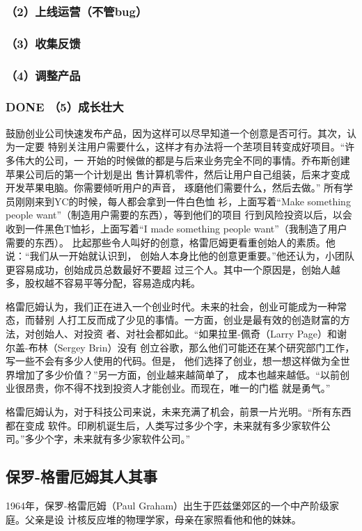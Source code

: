 \documentclass[11pt]{ctexart}
\begin{document}
{{{{\subsubsection{（2）上线运营（不管bug）}
\label{sec:orgb1d20eb}
\subsubsection{（3）收集反馈}
\label{sec:org1592720}
\subsubsection{（4）调整产品}
\label{sec:orgc1f4898}
\subsubsection{{\bfseries\sffamily DONE} （5）成长壮大}
\label{sec:orged9da84}
鼓励创业公司快速发布产品，因为这样可以尽早知道一个创意是否可行。其次，认为一定要
特别关注用户需要什么，这样才有办法将一个苤项目转变成好项目。“许多伟大的公司，一
开始的时候做的都是与后来业务完全不同的事情。乔布斯创建苹果公司后的第一个计划是出
售计算机零件，然后让用户自己组装，后来才变成开发苹果电脑。你需要倾听用户的声音，
琢磨他们需要什么，然后去做。” 所有学员刚刚来到YC的时候，每人都会拿到一件白色恤
衫，上面写着“Make something people want”（制造用户需要的东西），等到他们的项目
行到风险投资以后，以会收到一件黑色T恤衫，上面写着“I made something people
want”（我制造了用户需要的东西）。
比起那些令人叫好的创意，格雷厄姆更看重创始人的素质。他说：“我们从一开始就认识到，
创始人本身比他的创意更重要。”他还认为，小团队更容易成功，创始成员总数最好不要超
过三个人。其中一个原因是，创始人越多，股权越不容易平等分配，容易造成内耗。

格雷厄姆认为，我们正在进入一个创业时代。未来的社会，创业可能成为一种常态，而替别
人打工反而成了少见的事情。一方面，创业是最有效的创造财富的方法，对创始人、对投资
者、对社会都如此。“如果拉里-佩奇（Larry Page）和谢尔盖-布林（Sergey Brin）没有
创立谷歌，那么他们可能还在某个研究部门工作，写一些不会有多少人使用的代码。但是，
他们选择了创业，想一想这样做为全世界增加了多少价值？”另一方面，创业越来越简单了，
成本也越来越低。“以前创业很昂贵，你不得不找到投资人才能创业。而现在，唯一的门槛
就是勇气。”

格雷厄姆认为，对于科技公司来说，未来充满了机会，前景一片光明。“所有东西都在变成
软件。印刷机诞生后，人类写过多少个字，未来就有多少家软件公司。”多少个字，未来就有多少家软件公司。”

\subsection{保罗-格雷厄姆其人其事}
\label{sec:orgad85f90}
1964年，保罗-格雷厄姆（Paul Graham）出生于匹兹堡郊区的一个中产阶级家庭。父亲是设
计核反应堆的物理学家，母亲在家照看他和他的妹妹。

}}}}
\end{document}
